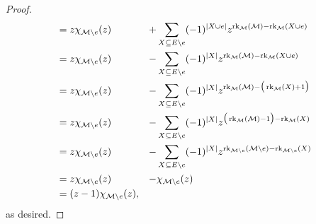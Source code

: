 \documentclass[12pt,oneside]{../../sfsuthesis}
\begin{document}
\begin{proof}
\begin{align*}
                    & = z\chi_{\mathcal{M} \setminus e}(z)                                                                                         & + & \sum_{X \subseteq E \setminus e} (-1)^{|X \cup e|} z^{\operatorname{rk}_{\mathcal{M}}(\mathcal{M}) - \operatorname{rk}_{\mathcal{M}}(X \cup e)}                             \\
                    & = z\chi_{\mathcal{M} \setminus e}(z)                                                                                         & - & \sum_{X \subseteq E \setminus e} (-1)^{|X|} z^{\operatorname{rk}_{\mathcal{M}}(\mathcal{M}) - \operatorname{rk}_{\mathcal{M}}(X \cup e)}                                    \\
                    & = z\chi_{\mathcal{M} \setminus e}(z)                                                                                         & - & \sum_{X \subseteq E \setminus e} (-1)^{|X|} z^{\operatorname{rk}_{\mathcal{M}}(\mathcal{M}) - \big(\operatorname{rk}_{\mathcal{M}}(X) + 1\big)}                             \\
                    & = z\chi_{\mathcal{M} \setminus e}(z)                                                                                         & - & \sum_{X \subseteq E \setminus e} (-1)^{|X|} z^{\big(\operatorname{rk}_{\mathcal{M}}(\mathcal{M}) - 1 \big)  - \operatorname{rk}_{\mathcal{M}}(X) }                          \\
                    & = z\chi_{\mathcal{M} \setminus e}(z)                                                                                         & - & \sum_{X \subseteq E \setminus e} (-1)^{|X|} z^{\operatorname{rk}_{\mathcal{M} \setminus e}(\mathcal{M} \setminus e)  - \operatorname{rk}_{\mathcal{M} \setminus e}(X) } \\
                    & = z\chi_{\mathcal{M} \setminus e}(z)                                                                                         & - & \chi_{\mathcal{M} \setminus e}(z)                                                                                           \\
                    & = (z - 1) \chi_{\mathcal{M} \setminus e}(z),                                                                                 &   &
    \end{align*}
    as desired.


\end{proof}
\end{document}
